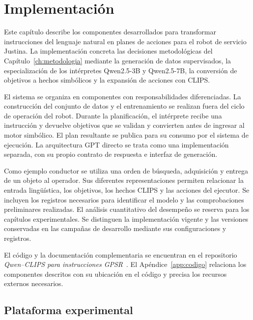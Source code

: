 \chapter{Implementación}
\label{ch:implementacion}

Este capítulo describe los componentes desarrollados para transformar
instrucciones del lenguaje natural en planes de acciones para el robot de servicio Justina.
La implementación concreta las decisiones metodológicas del
Capítulo~\ref{ch:metodologia} mediante la generación de datos supervisados,
la especialización de los intérpretes Qwen2.5-3B y Qwen2.5-7B,
la conversión de objetivos a
hechos simbólicos y la expansión de acciones con CLIPS.

El sistema se organiza en componentes con responsabilidades diferenciadas.
La construcción del conjunto de datos y el entrenamiento se realizan fuera
del ciclo de operación del robot. Durante la planificación, el intérprete
recibe una instrucción y devuelve objetivos que se validan y convierten
antes de ingresar al motor simbólico. El plan resultante se publica para
su consumo por el sistema de ejecución. La arquitectura GPT directo se
trata como una implementación separada, con su propio contrato de
respuesta e interfaz de generación.

Como ejemplo conductor se utiliza una orden de búsqueda, adquisición y
entrega de un objeto al operador. Sus diferentes
representaciones permiten relacionar la entrada lingüística, los objetivos,
los hechos CLIPS y las acciones del ejecutor. Se incluyen los registros
necesarios para identificar el modelo y las comprobaciones preliminares
realizadas. El análisis cuantitativo del desempeño se reserva para los capítulos
experimentales. Se distinguen la implementación vigente y las versiones
conservadas en las campañas de desarrollo mediante sus configuraciones y registros.

El código y la documentación complementaria se encuentran en el repositorio \textit{Qwen--CLIPS para instrucciones GPSR}~\cite{repositorio_qwen_tesis}. El Apéndice~\ref{app:codigo} relaciona los componentes descritos con su ubicación en el código y precisa los recursos externos necesarios.

\section{Plataforma experimental}
\label{sec:plataforma_implementacion}

